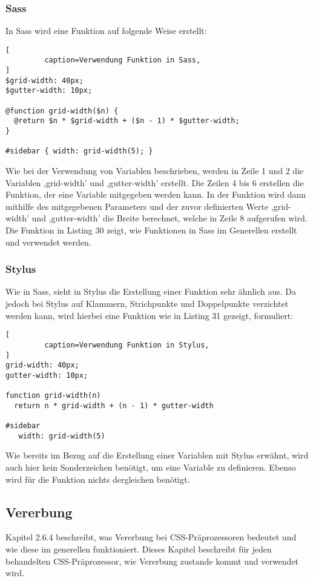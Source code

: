 \subsubsection{Sass}
In Sass wird eine Funktion auf folgende Weise erstellt:
\begin{lstlisting}[
         caption=Verwendung Funktion in Sass,
]
$grid-width: 40px;
$gutter-width: 10px;

@function grid-width($n) {
  @return $n * $grid-width + ($n - 1) * $gutter-width;
}

#sidebar { width: grid-width(5); }
\end{lstlisting}
Wie bei der Verwendung von Variablen beschrieben, werden in Zeile 1 und 2 die Variablen ,grid-width' und ,gutter-width' erstellt. Die Zeilen 4 bis 6 erstellen die Funktion, der eine Variable mitgegeben werden kann. In der Funktion wird dann mithilfe des mitgegebenen Parameters und der zuvor definierten Werte ,grid-width' und ,gutter-width' die Breite berechnet, welche in Zeile 8 aufgerufen wird.\newline
Die Funktion in Listing 30 zeigt, wie Funktionen in Sass im Generellen erstellt und verwendet werden.  
\subsubsection{Stylus}
Wie in Sass, sieht in Stylus die Erstellung einer Funktion sehr ähnlich aus. Da jedoch bei Stylus auf Klammern, Strichpunkte und Doppelpunkte verzichtet werden kann, wird hierbei eine Funktion wie in Listing 31 gezeigt, formuliert:
\begin{lstlisting}[
         caption=Verwendung Funktion in Stylus,
]
grid-width: 40px;
gutter-width: 10px;

function grid-width(n) 
  return n * grid-width + (n - 1) * gutter-width

#sidebar 
   width: grid-width(5)
\end{lstlisting}
Wie bereits im Bezug auf die Erstellung einer Variablen mit Stylus erwähnt, wird auch hier kein Sonderzeichen benötigt, um eine Variable zu definieren. Ebenso wird für die Funktion nichts dergleichen benötigt. \newline

\subsection{Vererbung}
Kapitel 2.6.4 beschreibt, was Vererbung bei CSS-Präprozessoren bedeutet und wie diese im generellen funktioniert. Dieses Kapitel beschreibt für jeden behandelten CSS-Präprozessor, wie Vererbung zustande kommt und verwendet wird.
